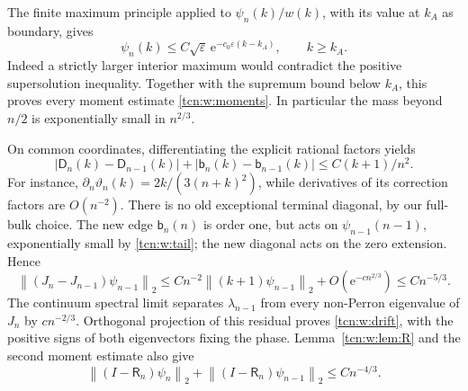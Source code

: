 \documentclass[11pt,letterpaper]{article}
\newcommand{\norm}[1]{\left\lVert#1\right\rVert}
\newcommand{\eps}{\varepsilon}
\newcommand{\ee}{\mathrm e}
\theoremstyle{remark}
\begin{document}
The finite maximum principle applied to $\psi_n(k)/w(k)$, with its value at $k_A$ as boundary, gives
\begin{equation}\label{tcn:w:tail}
 \psi_n(k)\le C\sqrt\eps\,\ee^{-c_0\eps(k-k_A)},\qquad k\ge k_A.
\end{equation}
Indeed a strictly larger interior maximum would contradict the positive supersolution inequality. Together with the supremum bound below $k_A$, this proves every moment estimate \eqref{tcn:w:moments}. In particular the mass beyond $n/2$ is exponentially small in $n^{2/3}$.

On common coordinates, differentiating the explicit rational factors yields
\begin{equation}\label{tcn:w:coefdrift}
 |\mathsf D_n(k)-\mathsf D_{n-1}(k)|+|\mathsf b_n(k)-\mathsf b_{n-1}(k)|
                  \le C(k+1)/n^2.
\end{equation}
For instance, $\partial_n\vartheta_n(k)=2k/(3(n+k)^2)$, while derivatives of its correction factors are $O(n^{-2})$. There is no old exceptional terminal diagonal, by our full-bulk choice. The new edge $\mathsf b_n(n)$ is order one, but acts on $\psi_{n-1}(n-1)$, exponentially small by \eqref{tcn:w:tail}; the new diagonal acts on the zero extension. Hence
\[
 \norm{(J_n-J_{n-1})\psi_{n-1}}_2
 \le Cn^{-2}\norm{(k+1)\psi_{n-1}}_2+O(\ee^{-cn^{2/3}})
 \le Cn^{-5/3}.
\]
The continuum spectral limit separates $\lambda_{n-1}$ from every non-Perron eigenvalue of $J_n$ by $cn^{-2/3}$. Orthogonal projection of this residual proves \eqref{tcn:w:drift}, with the positive signs of both eigenvectors fixing the phase. Lemma~\ref{tcn:w:lem:R} and the second moment estimate also give
\begin{equation}\label{tcn:w:Rsmall}
 \norm{(I-\mathsf R_n)\psi_n}_2+\norm{(I-\mathsf R_n)\psi_{n-1}}_2\le Cn^{-4/3}.
\end{equation}
\end{document}
